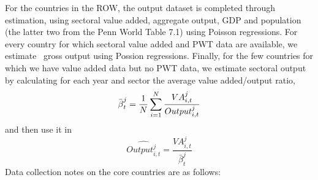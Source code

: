 \documentclass[12pt]{article}
\begin{document}
For the countries in the ROW, the output dataset is completed through
estimation, using sectoral value added, aggregate output, GDP and population
(the latter two from the Penn World Table 7.1) using Poisson regressions.
For every country for which sectoral value added and PWT data are available,
we estimate \ gross output using Possion regressions. Finally, for the few
countries for which we have value added data but no PWT data, we estimate
sectoral output by calculating for each year and sector the average value
added/output ratio, 
\begin{equation*}
\bar{\beta}_{t}^{j}=\frac{1}{N}\sum_{i=1}^{N}\frac{VA_{i,t}^{j}}{%
Output_{i,t}^{j}}
\end{equation*}%
and then use it in 
\begin{equation*}
\widehat{Output_{i,t}^{j}}=\frac{VA_{i,t}^{j}}{\bar{\beta}_{t}^{j}}
\end{equation*}%
Data collection notes on the core countries are as follows:
\end{document}
